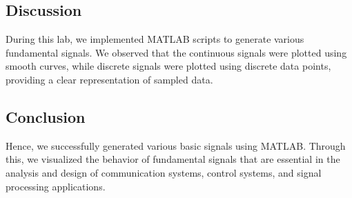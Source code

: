 \subsection*{Discussion}
During this lab, we implemented MATLAB scripts to generate various fundamental signals. We observed that the continuous signals were plotted using smooth curves, while discrete signals were plotted using discrete data points, providing a clear representation of sampled data. 
\subsection*{Conclusion}
Hence, we successfully generated various basic signals using MATLAB. Through this, we visualized the behavior of fundamental signals that are essential in the analysis and design of communication systems, control systems, and signal processing applications.